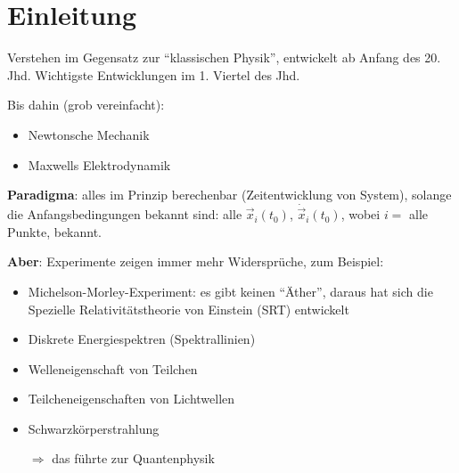 \chapter{Einleitung}

Verstehen im Gegensatz zur "`klassischen Physik"', entwickelt ab Anfang des 20. Jhd. Wichtigste Entwicklungen im 1. Viertel des Jhd.

Bis dahin (grob vereinfacht):
\begin{itemize}
	\item Newtonsche Mechanik
	\item Maxwells Elektrodynamik
\end{itemize}

\textbf{Paradigma}: alles im Prinzip berechenbar (Zeitentwicklung von System), solange die Anfangsbedingungen bekannt sind: alle $\vec{x}_i(t_0)$, $\dot{\vec{x}}_i(t_0)$, wobei $i =$ alle Punkte, bekannt.

\textbf{Aber}: Experimente zeigen immer mehr Widersprüche, zum Beispiel:
\begin{itemize}
	\item Michelson-Morley-Experiment: es gibt keinen "`Äther"', daraus hat sich die Spezielle Relativitätstheorie von Einstein (SRT) entwickelt
	\item Diskrete Energiespektren (Spektrallinien)
	\item Welleneigenschaft von Teilchen
	\item Teilcheneigenschaften von Lichtwellen
	\item Schwarzkörperstrahlung
	\item[$\Rightarrow$] das führte zur Quantenphysik 
\end{itemize}

